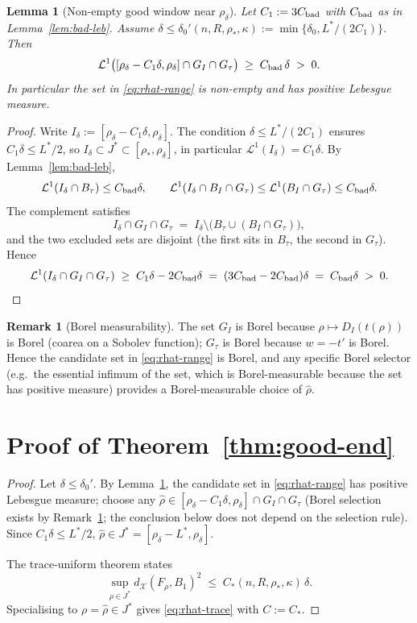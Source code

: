 \documentclass[11pt]{article}
\newtheorem{lemma}[theorem]{Lemma}
\theoremstyle{definition}
\newtheorem{remark}[theorem]{Remark}
\newcommand{\rstar}{\rho_{*}}
\newcommand{\rdel}{\rho_\delta}
\newcommand{\rhad}{\widehat\rho}
\newcommand{\X}{\mathcal X}
\begin{document}
\begin{lemma}[Non-empty good window near $\rdel$]\label{lem:window-nonempty}
Let $C_1:=3C_{\rm bad}$ with $C_{\rm bad}$ as in
Lemma~\ref{lem:bad-leb}.  Assume
$\delta\le\delta_0'(n,R,\rstar,\kappa):=\min\{\delta_0,L^*/(2C_1)\}$.
Then
\begin{equation}\label{eq:nonempty}
   \mathcal L^1\bigl([\rdel-C_1\delta,\rdel]\cap G_I\cap G_\tau\bigr)
   \;\ge\; C_{\rm bad}\,\delta\;>\;0.
\end{equation}
In particular the set in \eqref{eq:rhat-range} is non-empty and has
positive Lebesgue measure.
\end{lemma}

\begin{proof}
Write $I_\delta:=[\rdel-C_1\delta,\rdel]$.  The condition
$\delta\le L^*/(2C_1)$ ensures $C_1\delta\le L^*/2$, so
$I_\delta\subset J^*\subset[\rstar,\rdel]$, in particular
$\mathcal L^1(I_\delta)=C_1\delta$.
By Lemma~\ref{lem:bad-leb},
\[
   \mathcal L^1(I_\delta\cap B_\tau)\le C_{\rm bad}\delta,
   \qquad
   \mathcal L^1(I_\delta\cap B_I\cap G_\tau)
      \le \mathcal L^1(B_I\cap G_\tau)\le C_{\rm bad}\delta.
\]
The complement satisfies
\[
   I_\delta\cap G_I\cap G_\tau
   \;=\; I_\delta\setminus
      \bigl(B_\tau\cup (B_I\cap G_\tau)\bigr),
\]
and the two excluded sets are disjoint (the first sits in $B_\tau$, the
second in $G_\tau$).  Hence
\[
   \mathcal L^1(I_\delta\cap G_I\cap G_\tau)
   \;\ge\; C_1\delta - 2C_{\rm bad}\delta
   \;=\; (3C_{\rm bad}-2C_{\rm bad})\delta
   \;=\; C_{\rm bad}\delta\;>\;0.
\]
\end{proof}

\begin{remark}[Borel measurability]\label{rem:borel}
The set $G_I$ is Borel because $\rho\mapsto D_I(t(\rho))$ is Borel
(coarea on a Sobolev function); $G_\tau$ is Borel because $w=-t'$ is
Borel.  Hence the candidate set in \eqref{eq:rhat-range} is Borel, and
any specific Borel selector (e.g.\ the essential infimum of the set,
which is Borel-measurable because the set has positive measure)
provides a Borel-measurable choice of $\rhad$.
\end{remark}

\section{Proof of Theorem~\ref{thm:good-end}}\label{sec:proof}

\begin{proof}
Let $\delta\le\delta_0'$.  By Lemma~\ref{lem:window-nonempty}, the
candidate set in \eqref{eq:rhat-range} has positive Lebesgue measure;
choose any
$\rhad\in [\rdel-C_1\delta,\rdel]\cap G_I\cap G_\tau$ (Borel selection
exists by Remark~\ref{rem:borel}; the conclusion below does not depend
on the selection rule).
Since $C_1\delta\le L^*/2$, $\rhad\in J^*=[\rdel-L^*,\rdel]$.

The trace-uniform theorem
\cite[Thm.~3.3, eq.\ (trace-uniform)]{WeightedMetricTrace} states
\[
   \sup_{\rho\in J^*}d_\X(F_\rho,B_1)^2
   \;\le\; C_*(n,R,\rstar,\kappa)\,\delta.
\]
Specialising to $\rho=\rhad\in J^*$ gives
\eqref{eq:rhat-trace} with $C:=C_*$.
\end{proof}
\end{document}
